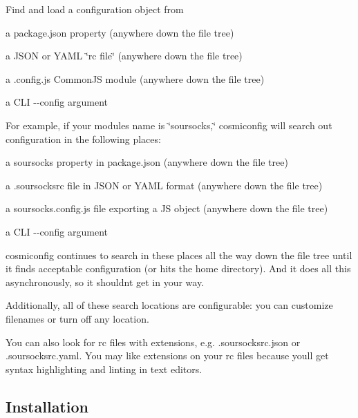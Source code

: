 \href{https://travis-ci.org/davidtheclark/cosmiconfig}{\tt } \href{https://ci.appveyor.com/project/davidtheclark/cosmiconfig/branch/master}{\tt }

Find and load a configuration object from
\begin{DoxyItemize}
\item a {\ttfamily package.\+json} property (anywhere down the file tree)
\item a J\+S\+ON or Y\+A\+ML \char`\"{}rc file\char`\"{} (anywhere down the file tree)
\item a {\ttfamily .config.\+js} Common\+JS module (anywhere down the file tree)
\item a C\+LI {\ttfamily -\/-\/config} argument
\end{DoxyItemize}

For example, if your module\textquotesingle{}s name is \char`\"{}soursocks,\char`\"{} cosmiconfig will search out configuration in the following places\+:
\begin{DoxyItemize}
\item a {\ttfamily soursocks} property in {\ttfamily package.\+json} (anywhere down the file tree)
\item a {\ttfamily .soursocksrc} file in J\+S\+ON or Y\+A\+ML format (anywhere down the file tree)
\item a {\ttfamily soursocks.\+config.\+js} file exporting a JS object (anywhere down the file tree)
\item a C\+LI {\ttfamily -\/-\/config} argument
\end{DoxyItemize}

cosmiconfig continues to search in these places all the way down the file tree until it finds acceptable configuration (or hits the home directory). And it does all this asynchronously, so it shouldn\textquotesingle{}t get in your way.

Additionally, all of these search locations are configurable\+: you can customize filenames or turn off any location.

You can also look for rc files with extensions, e.\+g. {\ttfamily .soursocksrc.\+json} or {\ttfamily .soursocksrc.\+yaml}. You may like extensions on your rc files because you\textquotesingle{}ll get syntax highlighting and linting in text editors.

\subsection*{Installation}


